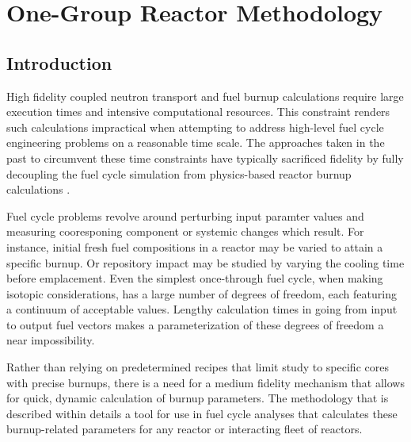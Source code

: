 \chapter{One-Group Reactor Methodology}
\label{1g_paper}



\section{Introduction}
\label{1g_sec:intro}
High fidelity coupled neutron transport and fuel burnup calculations require large execution times
and intensive computational resources.  This constraint renders such calculations impractical when 
attempting to address high-level fuel cycle engineering problems on a reasonable time scale.  
The approaches taken in the past to circumvent these time constraints have typically sacrificed 
fidelity by fully decoupling the fuel cycle simulation from physics-based reactor burnup calculations 
\cite{Jacobson2009}.  

Fuel cycle problems revolve around perturbing input paramter values and measuring cooresponing component or
systemic changes which result. For instance, initial fresh fuel compositions in a reactor may be varied 
to attain a specific 
burnup. Or repository impact may be studied by varying the cooling time before emplacement.  Even 
the simplest once-through fuel cycle, when making isotopic considerations, has a large number of degrees of 
freedom, each 
featuring a continuum of acceptable values.  Lengthy calculation times in going from input to output fuel vectors 
makes a parameterization of these degrees of freedom a near impossibility.  

Rather than relying on predetermined recipes that limit study to specific cores with precise burnups, 
there is a need for a medium fidelity mechanism that allows for quick, dynamic calculation of burnup 
parameters.  The methodology that is described within details a tool for use in fuel cycle analyses 
that calculates these burnup-related parameters for any reactor or interacting fleet of reactors.

